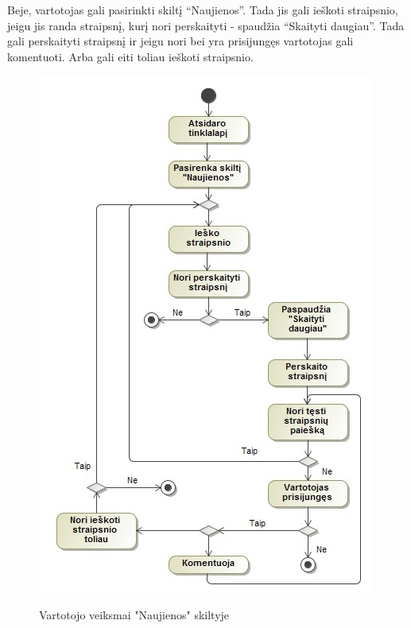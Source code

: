 ﻿\documentclass{VUMIFPSkursinis}
\begin{document}
Beje, vartotojas gali pasirinkti skiltį “Naujienos”. Tada jis gali ieškoti straipsnio, jeigu jis randa straipsnį, kurį nori perskaityti - spaudžia “Skaityti daugiau”. Tada gali perskaityti straipsnį ir jeigu nori bei yra prisijungęs vartotojas gali komentuoti. Arba gali eiti toliau ieškoti straipsnio.

\begin{figure}[H]
	\centering
    \includegraphics[scale=0.5]{img/Pav/VartotojasStraipsnis}
	\label{uml:23}
	\caption{Vartotojo veiksmai "Naujienos" skiltyje}
\end{figure}
\end{document}
